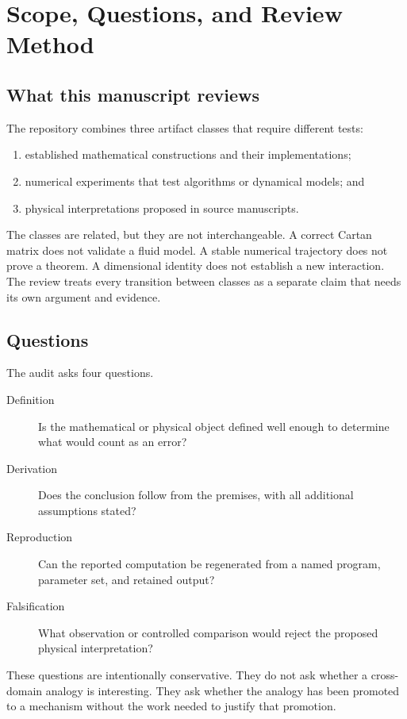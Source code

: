 \chapter{Scope, Questions, and Review Method}
\label{ch:scope}

\section{What this manuscript reviews}

The repository combines three artifact classes that require different tests:

\begin{enumerate}
  \item established mathematical constructions and their implementations;
  \item numerical experiments that test algorithms or dynamical models; and
  \item physical interpretations proposed in source manuscripts.
\end{enumerate}

The classes are related, but they are not interchangeable. A correct Cartan
matrix does not validate a fluid model. A stable numerical trajectory does not
prove a theorem. A dimensional identity does not establish a new interaction.
The review treats every transition between classes as a separate claim that
needs its own argument and evidence.

\section{Questions}

The audit asks four questions.

\begin{description}
  \item[Definition] Is the mathematical or physical object defined well enough
    to determine what would count as an error?
  \item[Derivation] Does the conclusion follow from the premises, with all
    additional assumptions stated?
  \item[Reproduction] Can the reported computation be regenerated from a named
    program, parameter set, and retained output?
  \item[Falsification] What observation or controlled comparison would reject
    the proposed physical interpretation?
\end{description}

These questions are intentionally conservative. They do not ask whether a
cross-domain analogy is interesting. They ask whether the analogy has been
promoted to a mechanism without the work needed to justify that promotion.

